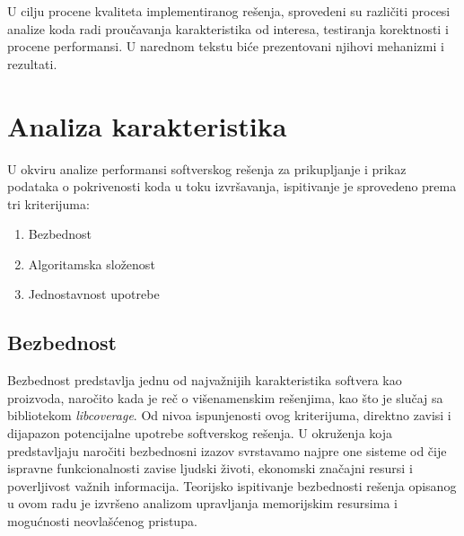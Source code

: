 \documentclass[12pt,oneside]{memoir}
\newcommand{\strano}[1]{\textit{#1}}
\begin{document}
U cilju procene kvaliteta implementiranog rešenja, sprovedeni su različiti procesi analize koda radi proučavanja karakteristika od interesa, testiranja korektnosti i procene performansi. U narednom tekstu biće prezentovani njihovi mehanizmi i rezultati.

\section{Analiza karakteristika}

U okviru analize performansi softverskog rešenja za prikupljanje i prikaz podataka o pokrivenosti koda u toku izvršavanja, ispitivanje je sprovedeno prema tri kriterijuma:
\begin{enumerate}
\item Bezbednost
\item Algoritamska složenost
\item Jednostavnost upotrebe
\end{enumerate}

\subsection{Bezbednost}

Bezbednost predstavlja jednu od najvažnijih karakteristika softvera kao proizvoda, naročito kada je reč o višenamenskim rešenjima, kao što je slučaj sa bibliotekom \strano{libcoverage}. Od nivoa ispunjenosti ovog kriterijuma, direktno zavisi i dijapazon potencijalne upotrebe softverskog rešenja. U okruženja koja predstavljaju naročiti bezbednosni izazov svrstavamo najpre one sisteme od čije ispravne funkcionalnosti zavise ljudski životi, ekonomski značajni resursi i poverljivost važnih informacija. Teorijsko ispitivanje bezbednosti rešenja opisanog u ovom radu je izvršeno analizom upravljanja memorijskim resursima i mogućnosti neovlašćenog pristupa. 
\end{document}
